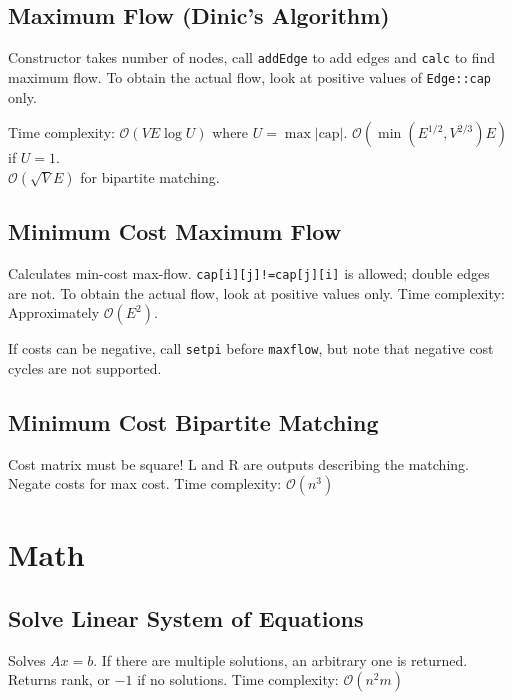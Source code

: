 \documentclass{article}
\begin{document}
\subsection*{Maximum Flow (Dinic's Algorithm)}

Constructor takes number of nodes, call \lstinline{addEdge} to add edges and \lstinline{calc} to find maximum flow.
To obtain the actual flow, look at positive values of \lstinline{Edge::cap} only.

Time complexity: $\mathcal{O}(VE\log U)$ where $U = \max |\text{cap}|$.
$\mathcal{O}(\min(E^{1/2}, V^{2/3})E)$ if $U = 1$.\\
$\mathcal{O}(\sqrt{V}E)$ for bipartite matching.


\subsection*{Minimum Cost Maximum Flow}

Calculates min-cost max-flow. \lstinline{cap[i][j]!=cap[j][i]} is allowed; double edges are not. To obtain the actual flow, look at positive values only. Time complexity: Approximately $\mathcal{O}(E^2)$.

If costs can be negative, call \lstinline{setpi} before \lstinline{maxflow}, but note that negative cost cycles are not supported.



\pagebreak

\subsection*{Minimum Cost Bipartite Matching}
Cost matrix must be square! L and R are outputs describing the matching. Negate costs for max cost. Time complexity: $\mathcal{O}(n^3)$


\pagebreak

\section*{Math}

\subsection*{Solve Linear System of Equations}
Solves $A x = b$. If there are multiple solutions, an arbitrary one is returned.
Returns rank, or $-1$ if no solutions. Time complexity: $\mathcal{O}(n^2 m)$

\end{document}

